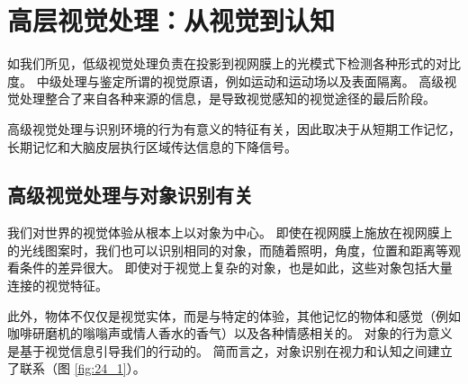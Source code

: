 \chapter{高层视觉处理：从视觉到认知} \label{chap:chap24}

如我们所见，低级视觉处理负责在投影到视网膜上的光模式下检测各种形式的对比度。
中级处理与鉴定所谓的视觉原语，例如运动和运动场以及表面隔离。
高级视觉处理整合了来自各种来源的信息，是导致视觉感知的视觉途径的最后阶段。


高级视觉处理与识别环境的行为有意义的特征有关，因此取决于从短期工作记忆，长期记忆和大脑皮层执行区域传达信息的下降信号。


\section{高级视觉处理与对象识别有关}

我们对世界的视觉体验从根本上以对象为中心。
即使在视网膜上施放在视网膜上的光线图案时，我们也可以识别相同的对象，而随着照明，角度，位置和距离等观看条件的差异很大。
即使对于视觉上复杂的对象，也是如此，这些对象包括大量连接的视觉特征。


此外，物体不仅仅是视觉实体，而是与特定的体验，其他记忆的物体和感觉（例如咖啡研磨机的嗡嗡声或情人香水的香气）以及各种情感相关的。
对象的行为意义是基于视觉信息引导我们的行动的。
简而言之，对象识别在视力和认知之间建立了联系（图 \ref{fig:24_1}）。

